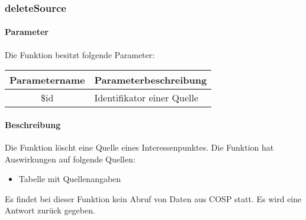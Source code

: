 \subsubsection{deleteSource}
\paragraph{Parameter} Die Funktion besitzt folgende Parameter:
\begin{table}[H]
	\begin{tabular}{|c|p{11cm}|}
		\hline
		\textbf{Parametername} & \textbf{Parameterbeschreibung} \\ \hline
		\$id & Identifikator einer Quelle \\ \hline
	\end{tabular}
\end{table}
\paragraph{Beschreibung} Die Funktion löscht eine Quelle eines Interessenpunktes. Die Funktion hat Auswirkungen auf folgende Quellen:
\begin{itemize}
	\item Tabelle mit Quellenangaben
\end{itemize}
Es findet bei dieser Funktion kein Abruf von Daten aus {\glqq COSP\grqq} statt. Es wird eine Antwort zurück gegeben.